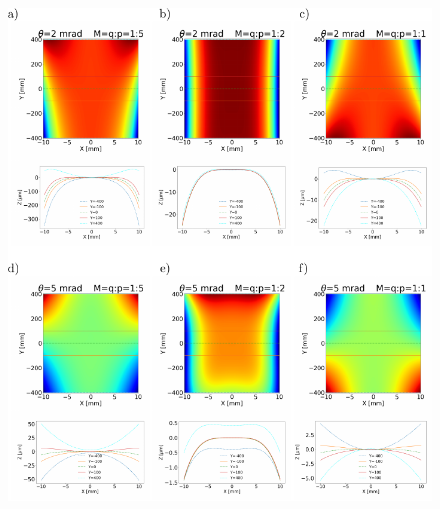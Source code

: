 \documentclass[preprint]{iucr}       %
\begin{document}
\begin{figure}\label{fig:detrended}
\includegraphics[width=1.0\textwidth]{figures/fig7.pdf}


\end{figure}
\end{document}
